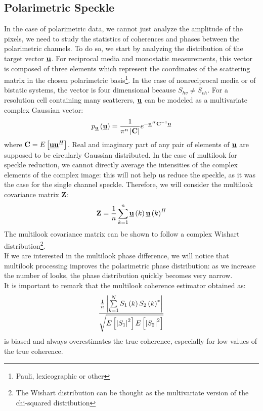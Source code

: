 \documentclass[11pt]{article}
\begin{document}
\subsection{Polarimetric Speckle}
In the case of polarimetric data, we cannot just analyze the amplitude of the pixels, we need to study the statistics of coherences and phases between the polarimetric channels. To do so, we start by analyzing the distribution of the target vector $\mathbf{\underline{u}}$. For reciprocal media and monostatic measurements, this vector is composed of three elements which represent the coordinates of the scattering matrix in the chosen polarimetric basis\footnote{Pauli, lexicographic or other}.
In the case of nonreciprocal media or of bistatic systems, the vector is four dimensional because $S_{hv} \neq S_{vh}$. For a resolution cell containing many scatterers, $\mathbf{\underline{u}}$ can be modeled as a multivariate complex Gaussian vector:
\begin{equation}
	p_{\mathbf{\underline{u}}}\left(\mathbf{\underline{u}}\right) = \frac{1}{\pi^{n}\left|\mathbf{C}\right|}e^{-\mathbf{\underline{u}}^{H}\mathbf{C}^{-1}\mathbf{\underline{u}}}
\end{equation}
where $\mathbf{C} = E\left[\mathbf{\underline{u}}\mathbf{\underline{u}}^{H}\right]$. Real and imaginary part of any pair of elements of $\mathbf{\underline{u}}$ are supposed to be circularly Gaussian distributed.
In the case of multilook for speckle reduction, we cannot directly average the intensities of the complex elements of the complex image: this will not help us reduce the speckle, as it was the case for the single channel speckle. Therefore, we will consider the multilook covariance matrix $\mathbf{Z}$:
\begin{equation}
	\mathbf{Z} = \frac{1}{n}\sum\limits_{k=1}^{n}\mathbf{\underline{u}}\left(k\right)\mathbf{\underline{u}}\left(k\right)^{H}
\end{equation}
The multilook covariance matrix can be shown to follow a complex Wishart distribution\footnote{The Wishart distribution can be thought as the multivariate version of the chi-squared distribution}.\\
If we are interested in the multilook phase difference, we will notice that multilook processing improves the polarimetric phase distribution: as we increase the number of looks, the phase distribution quickly becomes very narrow.\\
It is important to remark that the multilook coherence estimator obtained as:
\begin{equation}
	\frac{\frac{1}{n}\left|\sum\limits_{k=1}^{N}S_{1}\left(k\right)S_{2}\left(k\right)^{*}\right|}
	{\sqrt{E\left[\left|S_{1}\right|^2\right]E\left[\left|S_{2}\right|^2\right]}}
\end{equation}
is biased and always overestimates the true coherence, especially for low values of the true coherence.
\end{document}
